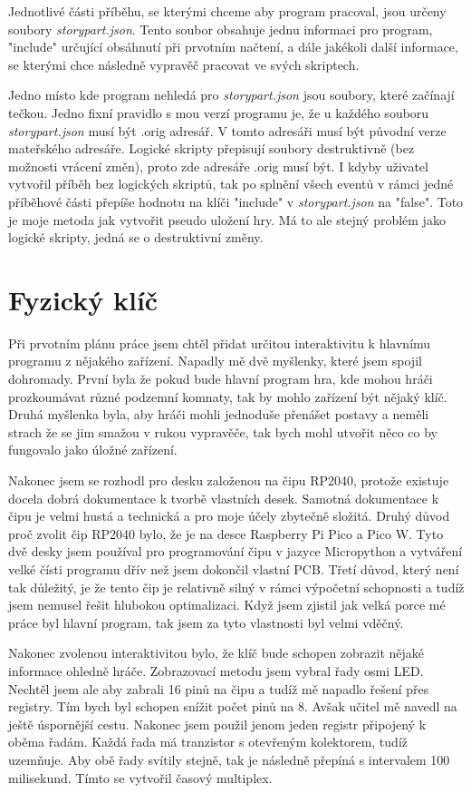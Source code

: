 \documentclass[12pt,a4paper]{article}
\begin{document}
Jednotlivé části příběhu, se kterými chceme aby program pracoval, jsou určeny soubory \textit{storypart.json}. Tento soubor obsahuje jednu informaci pro program, "include" určující obsáhnutí při prvotním načtení, a dále jakékoli další informace, se kterými chce následně vypravěč pracovat ve svých skriptech.

Jedno místo kde program nehledá pro \textit{storypart.json} jsou soubory, které začínají tečkou. Jedno fixní pravidlo s mou verzí programu je, že u každého souboru \textit{storypart.json} musí být .orig adresář. V tomto adresáři musí být původní verze mateřského adresáře. Logické skripty přepisují soubory destruktivně (bez možnosti vrácení změn), proto zde adresáře .orig musí být. I kdyby uživatel vytvořil příběh bez logických skriptů, tak po splnění všech eventů v rámci jedné příběhové části přepíše hodnotu na klíči "include" v \textit{storypart.json} na "false". Toto je moje metoda jak vytvořit pseudo uložení hry. Má to ale stejný problém jako logické skripty, jedná se o destruktivní změny.
\section{Fyzický klíč}
Při prvotním plánu práce jsem chtěl přidat určitou interaktivitu k hlavnímu programu z nějakého zařízení. Napadly mě dvě myšlenky, které jsem spojil dohromady. První byla že pokud bude hlavní program hra, kde mohou hráči prozkoumávat různé podzemní komnaty, tak by mohlo zařízení být nějaký klíč. Druhá myšlenka byla, aby hráči mohli jednoduše přenášet postavy a neměli strach že se jim smažou v rukou vypravěče, tak bych mohl utvořit něco co by fungovalo jako úložné zařízení.

Nakonec jsem se rozhodl pro desku založenou na čipu RP2040, protože existuje docela dobrá dokumentace k tvorbě vlastních desek. Samotná dokumentace k čipu je velmi hustá a technická a pro moje účely zbytečně složitá. Druhý důvod proč zvolit čip RP2040 bylo, že je na desce Raspberry Pi Pico a Pico W. Tyto dvě desky jsem používal pro programování čipu v jazyce Micropython a vytváření velké čísti programu dřív než jsem dokončil vlastní PCB. Třetí důvod, který není tak důležitý, je že tento čip je relativně silný v rámci výpočetní schopnosti a tudíž jsem nemusel řešit hlubokou optimalizaci. Když jsem zjistil jak velká porce mé práce byl hlavní program, tak jsem za tyto vlastnosti byl velmi vděčný.

Nakonec zvolenou interaktivitou bylo, že klíč bude schopen zobrazit nějaké informace ohledně hráče. Zobrazovací metodu jsem vybral řady osmi LED. Nechtěl jsem ale aby zabrali 16 pinů na čipu a tudíž mě napadlo řešení přes registry. Tím bych byl schopen snížit počet pinů na 8. Avšak učitel mě navedl na ještě úspornější cestu. Nakonec jsem použil jenom jeden registr připojený k oběma řadám. Každá řada má tranzistor s otevřeným kolektorem, tudíž uzemňuje. Aby obě řady svítily stejně, tak je následně přepíná s intervalem 100 milisekund. Tímto se vytvořil časový multiplex.
\end{document}
